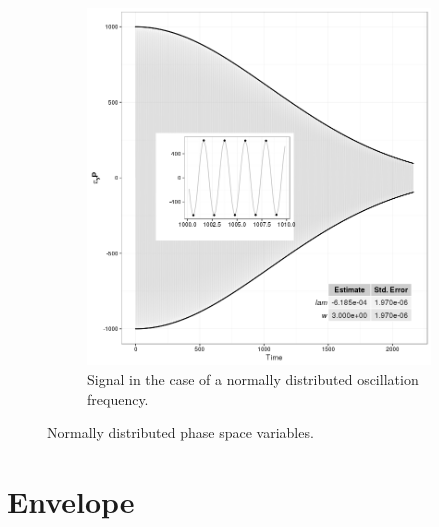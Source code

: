 \documentclass{article}
\begin{document}
\begin{figure}[h]
\begin{subfigure}{.5\textwidth}
		\includegraphics[scale=.5]{../img/Sgl_NormDistros}
		\caption{Signal in the case of a normally distributed oscillation frequency.}
	\end{subfigure}
	\caption{Normally distributed phase space variables.\label{fig:Sgl_cDyNorm}}
\end{figure}

\section{Envelope}
\end{document}
